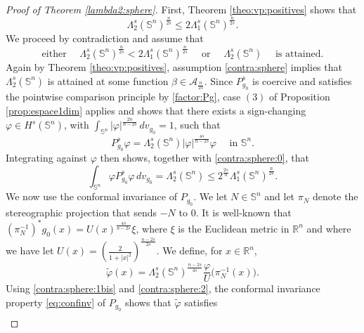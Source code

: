 \documentclass[10pt]{amsart}
\numberwithin{equation}{section}
\newcommand{\R}{\mathbb{R}}
\newcommand{\vp}{\varphi}
\theoremstyle{plain}
\theoremstyle{remark}
\begin{document}
\begin{proof}[Proof of Theorem \ref{lambda2:sphere}]
First, Theorem \ref{theo:vp:positives} shows that 
\begin{equation} \label{contra:sphere:0}
\Lambda_2^s(\mathbb{S}^n)^{\frac{n}{2s}} \le 2 \Lambda_1^s(\mathbb{S}^n)^{\frac{n}{2s}}. 
\end{equation}
We proceed by contradiction and assume that 
\begin{equation} \label{contra:sphere}
\text{ either } \quad \Lambda_2^s(\mathbb{S}^n)^{\frac{n}{2s}} < 2 \Lambda_1^s(\mathbb{S}^n)^{\frac{n}{2s}} \quad \text{ or } \quad \Lambda_2^s(\mathbb{S}^n) \quad \text{ is attained. } 
\end{equation}
Again by Theorem \ref{theo:vp:positives}, assumption \eqref{contra:sphere} implies that $\Lambda_2^s(\mathbb{S}^n)$ is attained at some function $\beta \in \mathcal{A}_{\frac{n}{2s}}$. Since $P_{g_0}^s$ is coercive and satisfies the pointwise comparison principle by \eqref{factor:Pg}, case $(3)$ of Proposition \ref{prop:espace1dim} applies and shows that there exists a sign-changing $\vp \in H^s(\mathbb{S}^n)$, with $\int_{\mathbb{S}^n} |\vp|^{\frac{2n}{n-2s}} \, dv_{g_0} = 1$, such that 
\begin{equation} \label{contra:sphere:1bis} 
P_{g_0}^s \vp = \Lambda_2^s(\mathbb{S}^n) |\vp|^{\frac{4s}{n-2s}} \vp \quad \text{ in } \mathbb{S}^n.
\end{equation}
Integrating against $\vp$ then shows, together with \eqref{contra:sphere:0}, that 
\begin{equation} \label{contra:sphere:2}
\int_{\mathbb{S}^n} \vp P_{g_0}^s \vp \, dv_{g_0} = \Lambda_2^s(\mathbb{S}^n) \le 2^{\frac{2s}{n}} \Lambda_1^s(\mathbb{S}^n)^{\frac{n}{2s}}.
\end{equation}
We now use the conformal invariance of $P_{g_0}$. We let $N \in \mathbb{S}^n$ and let $\pi_N$ denote the stereographic projection that sends $-N$ to $0$. It is well-known that $(\pi_N^{-1})^* g_0(x) = U(x)^{\frac{4s}{n-2s}} \xi$, where $\xi$ is the Euclidean metric in $\R^n$ and where we have let $ U(x) = \left(\frac{2}{1+|x|^2}\right)^{\frac{n-2s}{2s}}$. We define, for $x \in \R^n$, 
$$\tilde{\vp}(x) =  \Lambda_2^s(\mathbb{S}^n)^{\frac{n-2s}{4s}}\frac{\vp}{U}\big( \pi_N^{-1}(x) \big).$$ Using \eqref{contra:sphere:1bis} and \eqref{contra:sphere:2}, the conformal invariance property \eqref{eq:confinv} of $P_{g_0}$ shows that $\tilde{\vp}$ satisfies 
\begin{equation} \label{contra:sphere:3}
\begin{aligned}

\end{aligned}
\end{equation}
\end{proof}
\end{document}
